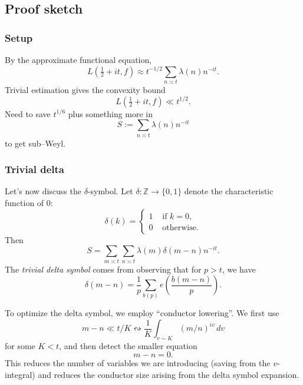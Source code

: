 \documentclass[reqno]{amsart} 
\begin{document}
\subsection{Proof sketch}

\subsubsection{Setup}

By the approximate functional equation,
\begin{equation*}
  L(\tfrac{1}{2} + i t, f) \approx t^{-1/2} \sum_{n \asymp t}
  \lambda(n) n^{- it}.
\end{equation*}
Trivial estimation gives the convexity bound
\begin{equation*}
  L(\tfrac{1}{2} + i t, f) \ll t^{1/2}.
\end{equation*}
Need to save $t^{1/6}$ plus something more in
\begin{equation*}
  S := \sum_{n \asymp t} \lambda(n) n^{- i t}
\end{equation*}
to get sub--Weyl.

\subsubsection{Trivial delta}

Let's now discuss the $\delta$-symbol.  Let $\delta : \mathbb{Z} \rightarrow \{0, 1\}$ denote the characteristic function of $0$:
\begin{equation*}
  \delta(k) =
  \begin{cases}
    1 & \text{ if } k = 0, \\
    0 & \text{ otherwise.}
  \end{cases}
\end{equation*}
Then
\begin{equation*}
  S = \sum_{m \asymp t} \sum_{n \asymp t}
  \lambda(m) \delta(m - n) n^{- it}.
\end{equation*}
The \emph{trivial delta symbol} comes from observing that for $p > t$, we have
\begin{equation*}
  \delta(m - n) = \frac{1}{p}
  \sum_{b(p)} e \left( \frac{b(m - n)}{p} \right).
\end{equation*}

To optimize the delta symbol, we employ ``conductor lowering''.  We first use
\begin{equation*}
  m - n \ll t / K  \leftrightsquigarrow
  \frac{1}{K}
  \int_{v \sim K}
  (m / n)^{i v} \, d v
\end{equation*}
for some $K < t$, and then detect the smaller equation
\begin{equation*}
  m - n = 0.
\end{equation*}
This reduces the number of variables we are introducing (saving from the $v$-integral) and reduces the conductor size arising from the delta symbol expansion.
\end{document}
